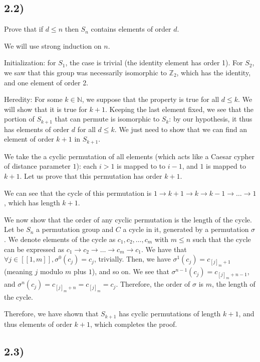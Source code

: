 \subsection*{2.2)}

Prove that if $d \leq n$ then $S_n$ contains elements of order $d$.

We will use strong induction on $n$.

Initialization: for $S_1$, the case is trivial (the identity element has order 1). For $S_2$, we saw that this group was necessarily isomorphic to $\mathbb{Z}_2$, which has the identity, and one element of order 2.

Heredity: For some $k \in \mathbb{N}$, we suppose that the property is true for all $d \leq k$. We will show that it is true for $k+1$. Keeping the last element fixed, we see that the portion of $S_{k+1}$ that can permute is isomorphic to $S_k$: by our hypothesis, it thus has elements of order $d$ for all $d \leq k$. We just need to show that we can find an element of order $k+1$ in $S_{k+1}$.

We take the a cyclic permutation of all elements (which acts like a Caesar cypher of distance parameter $1$): each $i > 1$ is mapped to to $i-1$, and $1$ is mapped to $k+1$. Let us prove that this permutation has order $k+1$.

We can see that the cycle of this permutation is $1 \rightarrow k+1 \rightarrow k \rightarrow k-1 \rightarrow \ldots \rightarrow 1$, which has length $k+1$.

We now show that the order of any cyclic permutation is the length of the cycle. Let be $S_n$ a permutation group and $C$ a cycle in it, generated by a permutation $\sigma$. We denote elements of the cycle as $c_1, c_2, \ldots, c_m$ with $m \leq n$ such that the cycle can be expressed as $c_1 \rightarrow c_2 \rightarrow \ldots \rightarrow c_m \rightarrow c_1$. We have that $\forall j \in [[1, m]], \sigma^0(c_j) = c_j$, trivially. Then, we have $\sigma^1(c_j) = c_{[j]_m + 1}$ (meaning $j$ modulo $m$ plus $1$), and so on. We see that $\sigma^{n-1}(c_j) = c_{[j]_m + n-1}$, and $\sigma^n(c_j) = c_{[j]_m + n} = c_{[j]_m} = c_j$. Therefore, the order of $\sigma$ is $m$, the length of the cycle.

Therefore, we have shown that $S_{k+1}$ has cyclic permutations of length $k+1$, and thus elements of order $k+1$, which completes the proof.


\subsection*{2.3)}

